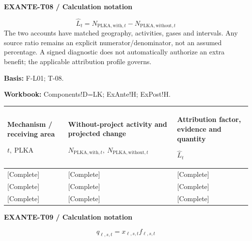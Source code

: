 \textbf{EXANTE-T08 / Calculation notation}\par
{\fontsize{9}{11}\selectfont\[ \widehat L_t=N_{\mathrm{PLKA,with},t}-N_{\mathrm{PLKA,without},t} \]}
The two accounts have matched geography, activities, gases and intervals. Any source ratio remains an explicit numerator/denominator, not an assumed percentage. A signed diagnostic does not automatically authorize an extra benefit; the applicable attribution profile governs.\par
\textbf{Basis:} F-L01; T-08.\par
\textbf{Workbook:} Components!D=LK; ExAnte!H; ExPost!H.\par\endgroup
{\sffamily\fontsize{8.3}{10.3}\selectfont\begin{longtable}{@{}P{54.83mm} P{54.83mm} P{54.83mm}@{}}
\toprule
\textbf{Mechanism / receiving area}\par {\normalfont\fontsize{8.2}{10}\selectfont $t,\ \mathrm{PLKA}$} & \textbf{Without-project activity and projected change}\par {\normalfont\fontsize{8.2}{10}\selectfont $N_{\mathrm{PLKA,with},t},\ N_{\mathrm{PLKA,without},t}$} & \textbf{Attribution factor, evidence and quantity}\par {\normalfont\fontsize{8.2}{10}\selectfont $\widehat L_t$}\\\midrule\endhead
\rule{0pt}{8mm}[Complete] & [Complete] & [Complete]\\\hline
\rule{0pt}{8mm}[Complete] & [Complete] & [Complete]\\\hline
\rule{0pt}{8mm}[Complete] & [Complete] & [Complete]\\\hline
\end{longtable}}
\par\begingroup\sffamily\fontsize{8}{10}\selectfont\color{NEBGreen}\setlength{\parskip}{2pt}\setlength{\abovedisplayskip}{4pt}\setlength{\belowdisplayskip}{4pt}\setlength{\abovedisplayshortskip}{2pt}\setlength{\belowdisplayshortskip}{3pt}
\textbf{EXANTE-T09 / Calculation notation}\par
{\fontsize{9}{11}\selectfont\[ q_{\ell,s,t}=x_{\ell,s,t}f_{\ell,s,t} \]}
